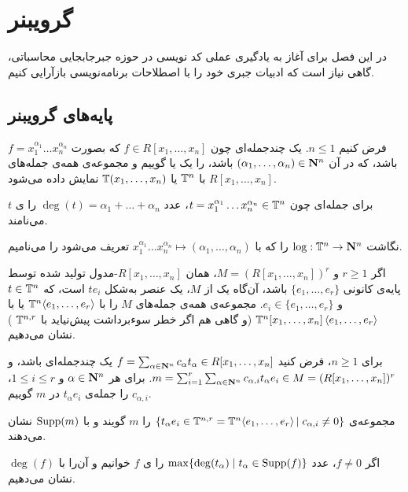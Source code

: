 
\chapter{گرویبنر}
در این فصل برای آغاز به یادگیری عملی کد نویسی در حوزه جبرجابجایی محاسباتی، گاهی نیاز است که ادبیات جبری خود را با اصطلاحات برنامه‌نویسی بازآرایی کنیم.
\section{پایه‌های گرویبنر}
فرض کنیم
$n\le 1$.
یک چندجمله‌ای چون
$f\in R[x_1,\dots,x_n]$
که بصورت
$f=x_1^{\alpha_1}\dots x_n^{\alpha_n}$
باشد، که در آن 
$(\alpha_1,\dots,\alpha_n)\in{\bf N}^n$
باشد، را یک  یا  گوییم و مجموعه‌ی همه‌ی جمله‌های 
$R[x_1,\dots,x_n]$
با
${\Bbb T}^n$ 
یا
${\Bbb T}(x_1,\dots,x_n)$
نمایش داده می‌شود.

برای جمله‌ای چون
$t=x_1^{\alpha_1}\dots x_n^{\alpha_n}\in{\Bbb T}^n$،
عدد
$\deg(t)=\alpha_1+\dots+\alpha_n$
را ی $t$ می‌نامند.

نگاشت
$\log:{\Bbb T}^n\to{\bf N}^n$
را که با 
$x_1^{\alpha_1}\dots x_n^{\alpha_n}\mapsto(\alpha_1,\dots,\alpha_n)$
تعریف می‌شود را  می‌نامیم.

اگر
$r\ge 1$
و
$M=(R[x_1,\dots,x_n])^r$،
همان $R[x_1,\dots,x_n]$-مدول تولید شده توسط پایه‌ی کانونی
$\{e_1,\dots,e_r\}$
باشد، آن‌گاه یک   از $M$، یک عنصر به‌شکل
$te_i$
است، که 
$t\in{\Bbb T}^n$
و
$e_i\in\{e_1,\dots,e_r\}$.
مجموعه‌ی همه‌ی جمله‌های $M$ را با
${\Bbb T}^n\!\left<e_1,\dots,e_r\right>$
یا با
${\Bbb T}^n[x_1,\dots,x_n]\left<e_1,\dots,e_r\right>$
(و گاهی هم اگر خطر سوءبرداشت پیش‌نیاید با
${\Bbb T}^{n,r}$
)
نشان می‌دهیم.

برای $n\ge1$، فرض کنید 
$f=\sum_{\alpha\in{\bf N}^n}c_\alpha t_\alpha\in R[x_1,\dots,x_n]$
یک چندجمله‌ای باشد، و
$m=\sum_{i=1}^r\sum_{\alpha\in{\bf N}^n}c_{\alpha,i} t_\alpha e_i\in M=(R[x_1,\dots,x_n])^r$.
برای هر
$\alpha\in{\bf N}^n$
و 
$1\le i\le r$،
$c_{\alpha,i}$
را  جمله‌ی $t_\alpha e_i$ در $m$ گوییم.

مجموعه‌ی
$\{t_\alpha e_i\in {\Bbb T}^{n,r}={\Bbb T}^n\!\left<e_1,\dots,e_r\right>|\; c_{\alpha,i}\ne 0\}$
را  $m$ گویند و با
$\operatorname{Supp}(m)$
نشان می‌دهند.

اگر 
$f\ne 0$،
عدد 
$\max\{\deg(t_\alpha)\;|\;t_\alpha\in\operatorname{Supp}(f)\}$
را ی $f$ خوانیم و آن‌را با
$\deg(f)$
نشان می‌دهیم.
